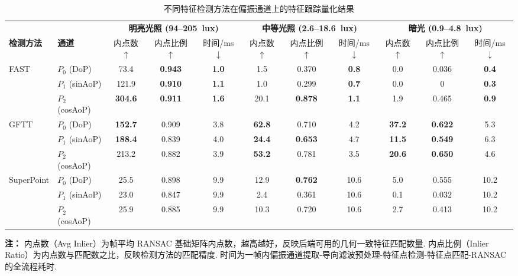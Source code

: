 \begin{table}[t]
\centering
\caption{不同特征检测方法在偏振通道上的特征跟踪量化结果}
\label{tab:fp_metrics}
\footnotesize
\setlength{\tabcolsep}{3.5pt}
\begin{tabular}{llccccccccc}
\toprule
& & \multicolumn{3}{c}{\bfseries 明亮光照 (94--205~lux)} & \multicolumn{3}{c}{\bfseries 中等光照 (2.6--18.6~lux)} & \multicolumn{3}{c}{\bfseries 暗光 (0.9--4.8~lux)} \\
\cmidrule(lr){3-5} \cmidrule(lr){6-8} \cmidrule(lr){9-11}
\multirow{-2}{*}{\bfseries 检测方法} & \multirow{-2}{*}{\bfseries 通道} & 内点数$\uparrow$ & 内点比例$\uparrow$ & 时间/ms$\downarrow$ & 内点数$\uparrow$ & 内点比例$\uparrow$ & 时间/ms$\downarrow$ & 内点数$\uparrow$ & 内点比例$\uparrow$ & 时间/ms$\downarrow$ \\
\midrule

\multirow{3}{*}{FAST}
    & $P_0$ (DoP)     & 73.4  & \textbf{0.943} & \textbf{1.0}  & 1.5   & 0.370 & \textbf{0.8}  & 0.0   & 0.036 & \textbf{0.4} \\
    & $P_1$ (sinAoP)  & 121.9 & \textbf{0.910} & \textbf{1.1}  & 1.0   & 0.299 & \textbf{0.7}  & 0.0   & 0     & \textbf{0.3} \\
    & $P_2$ (cosAoP)  & \textbf{304.6} & \textbf{0.911} & \textbf{1.6}  & 20.1  & \textbf{0.878} & \textbf{1.1}  & 1.9   & 0.465 & \textbf{0.9} \\
\cmidrule{2-11}

\multirow{3}{*}{GFTT}
    & $P_0$ (DoP)     & \textbf{152.7} & 0.909 & 3.8  & \textbf{62.8} & 0.710 & 4.2  & \textbf{37.2} & \textbf{0.622} & 5.3 \\
    & $P_1$ (sinAoP)  & \textbf{188.4} & 0.839 & 4.0  & \textbf{24.4} & \textbf{0.653} & 4.7  & \textbf{11.5} & \textbf{0.549} & 6.3 \\
    & $P_2$ (cosAoP)  & 213.2 & 0.882 & 3.9  & \textbf{53.2} & 0.781 & 3.5  & \textbf{20.6} & \textbf{0.650} & 4.6 \\
\cmidrule{2-11}

\multirow{3}{*}{SuperPoint}
    & $P_0$ (DoP)     & 25.5  & 0.898 & 9.9  & 12.9  & \textbf{0.762} & 10.6 & 5.0   & 0.555 & 10.2 \\
    & $P_1$ (sinAoP)  & 23.0  & 0.847 & 9.9  & 2.4   & 0.361 & 10.6 & 0.1   & 0.032 & 10.2 \\
    & $P_2$ (cosAoP)  & 25.9  & 0.885 & 9.9  & 10.3  & 0.720 & 10.6 & 2.7   & 0.413 & 10.2 \\

\midrule
\end{tabular}

\vspace{4pt}
\begin{minipage}{\textwidth}
\footnotesize
\textbf{注：}
内点数（Avg Inlier）为帧平均 RANSAC 基础矩阵内点数，越高越好，反映后端可用的几何一致特征匹配数量.
内点比例（Inlier Ratio）为内点数与匹配数之比，反映检测方法的匹配精度.
时间为一帧内偏振通道提取-导向滤波预处理-特征点检测-特征点匹配-RANSAC的全流程耗时.
\end{minipage}
\end{table}



